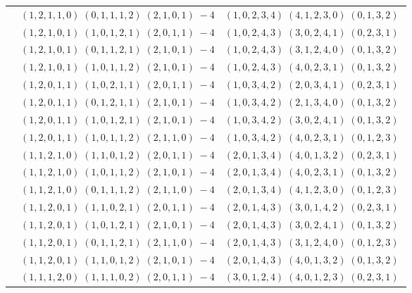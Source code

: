 \documentclass[11pt]{article}
\begin{document}
\begin{longtable}[l]{|c|c|c|}
 \cline{2-3} 
 & $(1 ,2 ,1 ,1 ,0) \;(0 ,1 ,1 ,1 ,2) \;(2 ,1 ,0 ,1) \;-4$ & $(1 ,0 ,2 ,3 ,4) \;(4 ,1 ,2 ,3 ,0) \;(0 ,1 ,3 ,2) \;$\\ 
 \cline{2-3} 
 & $(1 ,2 ,1 ,0 ,1) \;(1 ,0 ,1 ,2 ,1) \;(2 ,0 ,1 ,1) \;-4$ & $(1 ,0 ,2 ,4 ,3) \;(3 ,0 ,2 ,4 ,1) \;(0 ,2 ,3 ,1) \;$\\ 
 \cline{2-3} 
 & $(1 ,2 ,1 ,0 ,1) \;(0 ,1 ,1 ,2 ,1) \;(2 ,1 ,0 ,1) \;-4$ & $(1 ,0 ,2 ,4 ,3) \;(3 ,1 ,2 ,4 ,0) \;(0 ,1 ,3 ,2) \;$\\ 
 \cline{2-3} 
 & $(1 ,2 ,1 ,0 ,1) \;(1 ,0 ,1 ,1 ,2) \;(2 ,1 ,0 ,1) \;-4$ & $(1 ,0 ,2 ,4 ,3) \;(4 ,0 ,2 ,3 ,1) \;(0 ,1 ,3 ,2) \;$\\ 
 \cline{2-3} 
 & $(1 ,2 ,0 ,1 ,1) \;(1 ,0 ,2 ,1 ,1) \;(2 ,0 ,1 ,1) \;-4$ & $(1 ,0 ,3 ,4 ,2) \;(2 ,0 ,3 ,4 ,1) \;(0 ,2 ,3 ,1) \;$\\ 
 \cline{2-3} 
 & $(1 ,2 ,0 ,1 ,1) \;(0 ,1 ,2 ,1 ,1) \;(2 ,1 ,0 ,1) \;-4$ & $(1 ,0 ,3 ,4 ,2) \;(2 ,1 ,3 ,4 ,0) \;(0 ,1 ,3 ,2) \;$\\ 
 \cline{2-3} 
 & $(1 ,2 ,0 ,1 ,1) \;(1 ,0 ,1 ,2 ,1) \;(2 ,1 ,0 ,1) \;-4$ & $(1 ,0 ,3 ,4 ,2) \;(3 ,0 ,2 ,4 ,1) \;(0 ,1 ,3 ,2) \;$\\ 
 \cline{2-3} 
 & $(1 ,2 ,0 ,1 ,1) \;(1 ,0 ,1 ,1 ,2) \;(2 ,1 ,1 ,0) \;-4$ & $(1 ,0 ,3 ,4 ,2) \;(4 ,0 ,2 ,3 ,1) \;(0 ,1 ,2 ,3) \;$\\ 
 \cline{2-3} 
 & $(1 ,1 ,2 ,1 ,0) \;(1 ,1 ,0 ,1 ,2) \;(2 ,0 ,1 ,1) \;-4$ & $(2 ,0 ,1 ,3 ,4) \;(4 ,0 ,1 ,3 ,2) \;(0 ,2 ,3 ,1) \;$\\ 
 \cline{2-3} 
 & $(1 ,1 ,2 ,1 ,0) \;(1 ,0 ,1 ,1 ,2) \;(2 ,1 ,0 ,1) \;-4$ & $(2 ,0 ,1 ,3 ,4) \;(4 ,0 ,2 ,3 ,1) \;(0 ,1 ,3 ,2) \;$\\ 
 \cline{2-3} 
 & $(1 ,1 ,2 ,1 ,0) \;(0 ,1 ,1 ,1 ,2) \;(2 ,1 ,1 ,0) \;-4$ & $(2 ,0 ,1 ,3 ,4) \;(4 ,1 ,2 ,3 ,0) \;(0 ,1 ,2 ,3) \;$\\ 
 \cline{2-3} 
 & $(1 ,1 ,2 ,0 ,1) \;(1 ,1 ,0 ,2 ,1) \;(2 ,0 ,1 ,1) \;-4$ & $(2 ,0 ,1 ,4 ,3) \;(3 ,0 ,1 ,4 ,2) \;(0 ,2 ,3 ,1) \;$\\ 
 \cline{2-3} 
 & $(1 ,1 ,2 ,0 ,1) \;(1 ,0 ,1 ,2 ,1) \;(2 ,1 ,0 ,1) \;-4$ & $(2 ,0 ,1 ,4 ,3) \;(3 ,0 ,2 ,4 ,1) \;(0 ,1 ,3 ,2) \;$\\ 
 \cline{2-3} 
 & $(1 ,1 ,2 ,0 ,1) \;(0 ,1 ,1 ,2 ,1) \;(2 ,1 ,1 ,0) \;-4$ & $(2 ,0 ,1 ,4 ,3) \;(3 ,1 ,2 ,4 ,0) \;(0 ,1 ,2 ,3) \;$\\ 
 \cline{2-3} 
 & $(1 ,1 ,2 ,0 ,1) \;(1 ,1 ,0 ,1 ,2) \;(2 ,1 ,0 ,1) \;-4$ & $(2 ,0 ,1 ,4 ,3) \;(4 ,0 ,1 ,3 ,2) \;(0 ,1 ,3 ,2) \;$\\ 
 \cline{2-3} 
 & $(1 ,1 ,1 ,2 ,0) \;(1 ,1 ,1 ,0 ,2) \;(2 ,0 ,1 ,1) \;-4$ & $(3 ,0 ,1 ,2 ,4) \;(4 ,0 ,1 ,2 ,3) \;(0 ,2 ,3 ,1) \;$\\ 

\end{longtable}
\end{document}
